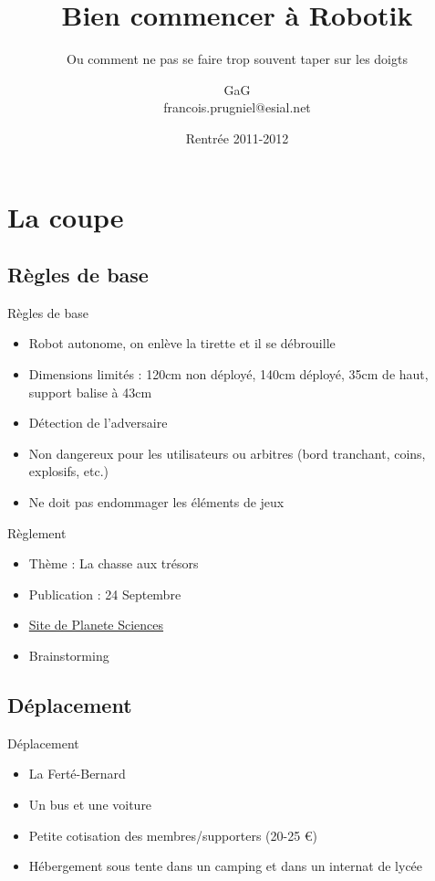 \documentclass{beamer}
\title{Bien commencer à Robotik}
\subtitle{Ou comment ne pas se faire trop souvent taper sur les doigts}
\author{GaG \\ francois.prugniel@esial.net}
\date{Rentrée 2011-2012}
\begin{document}
\begin{frame}
	\titlepage
\end{frame}

\begin{frame}
	\tableofcontents[hideallsubsections]
\end{frame}

\section{La coupe}
\subsection{Règles de base}
\begin{frame}{Règles de base}
	\begin{itemize}
		\item Robot autonome, on enlève la tirette et il se débrouille
		\item Dimensions limités : 120cm non déployé, 140cm déployé, 35cm de haut, support balise à 43cm
		\item Détection de l'adversaire
		\item Non dangereux pour les utilisateurs ou arbitres (bord tranchant, coins, explosifs, etc.)
		\item Ne doit pas endommager les éléments de jeux
	\end{itemize}
\end{frame}

\begin{frame}{Règlement}
	\begin{itemize}
		\item Thème : La chasse aux trésors
		\item Publication : 24 Septembre
		\item \href{http://www.planete-sciences.org/}{Site de Planete Sciences}
		\item Brainstorming
	\end{itemize}
\end{frame}

\subsection{Déplacement}
\begin{frame}{Déplacement}
	\begin{itemize}
		\item La Ferté-Bernard
		\item Un bus et une voiture
		\item Petite cotisation des membres/supporters (20-25 \euro)
		\item Hébergement sous tente dans un camping et dans un internat de lycée
	\end{itemize}
\end{frame}
\end{document}
